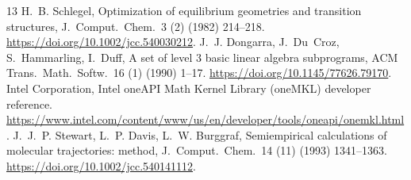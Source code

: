 \documentclass[preprint,12pt]{elsarticle}
\begin{document}
\begin{thebibliography}{13}
 H.~B. Schlegel, Optimization of equilibrium geometries and transition structures, J.\ Comput.\ Chem.\ 3 (2) (1982) 214--218. \url{https://doi.org/10.1002/jcc.540030212}.
 J.~J. Dongarra, J.~Du~Croz, S.~Hammarling, I.~Duff, A set of level 3 basic linear algebra subprograms, ACM Trans.\ Math.\ Softw.\ 16 (1) (1990) 1--17. \url{https://doi.org/10.1145/77626.79170}.
 Intel Corporation, Intel oneAPI Math Kernel Library (oneMKL) developer reference. \url{https://www.intel.com/content/www/us/en/developer/tools/oneapi/onemkl.html}.
 J.~J.~P. Stewart, L.~P. Davis, L.~W. Burggraf, Semiempirical calculations of molecular trajectories: method, J.\ Comput.\ Chem.\ 14 (11) (1993) 1341--1363. \url{https://doi.org/10.1002/jcc.540141112}.
\end{thebibliography}
\end{document}
